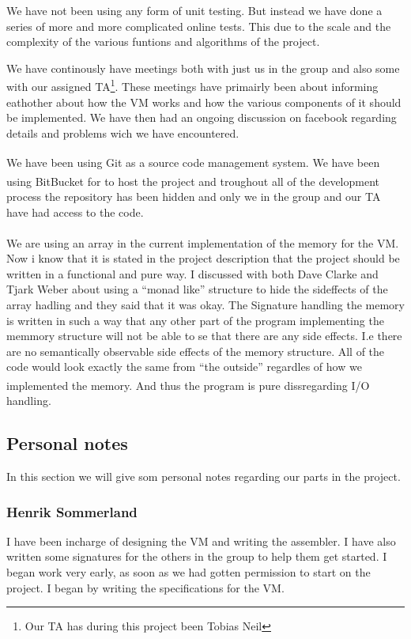 \documentclass{article}
\begin{document}
We have not been using any form of unit testing. But instead we have done a
series of more and more complicated online tests. This due to the scale and the
complexity of the various funtions and algorithms of the project.

We have continously have meetings both with just us in the group and also some
with our assigned TA\footnote{Our TA has during this project been Tobias Neil}.
These meetings have primairly been about informing eathother about how the 
VM works and how the various components of it should be
implemented. We have then had an ongoing discussion on facebook regarding
details and problems wich we have encountered.

We have been using Git\textsuperscript{\cite{git}} as a source code management
system. We have been using BitBucket\textsuperscript{\cite{bitbucket}} for to
host the project and troughout all of the development process the repository has 
been hidden and only we in the group and our TA have had access to the code.\\
\\
We are using an array  in the current implementation of the memory for the VM.
Now i know that it is stated in the project description that the project should
be written in a functional and pure way. I discussed with both Dave Clarke and
Tjark Weber about using a ``monad like'' structure to hide the sideffects of the
array hadling and they said that it was okay. The Signature handling the memory
is written in such a way that any other part of the program implementing the
memmory structure will not be able to se that there are any side effects. I.e
there are no semantically observable side effects of the memory structure. All
of the code would look exactly the same from ``the outside'' regardles of how we
implemented the memory. And thus the program is
pure\textsuperscript{\cite{pure}} dissregarding I/O handling.

\subsection{Personal notes}
In this section we will give som personal notes regarding our parts in the
project.
\subsubsection{Henrik Sommerland}
I have been incharge of designing the VM and writing the assembler. I have also
written some signatures for the others in the group to help them get started. I
began work very early, as soon as we had gotten permission to start on the
project. I  began by writing the specifications for the VM.
\end{document}
